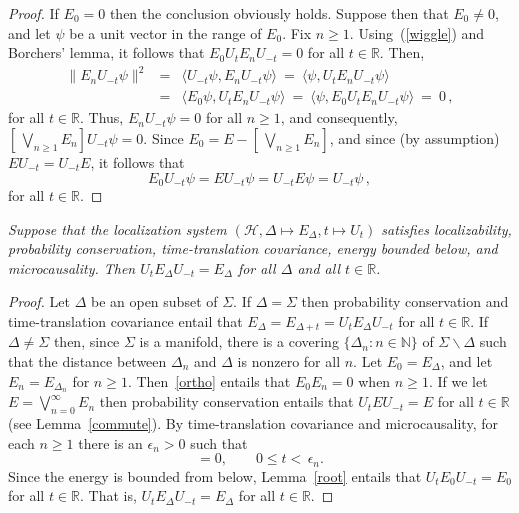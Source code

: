 \documentclass[11pt]{article}
\theoremstyle{remark}
\newcommand{\hil}[1]{\mathcal{#1}}
\begin{document}
\begin{appendix}
\begin{proof} If $E_{0}=0$ then the conclusion obviously
  holds.  Suppose then that $E_{0}\neq 0$, and let $\psi$ be a unit
  vector in the range of $E_{0}$.  Fix $n\geq 1$.
  Using~(\ref{wiggle}) and Borchers' lemma, it follows that
  $E_{0}U_{t}E_{n}U_{-t}=0$ for all $t\in \mathbb{R}$.  Then,
\begin{eqnarray}
\| E_{n}U_{-t}\psi \| ^{2} &=&\langle U_{-t}\psi ,E_{n}U_{-t}\psi \rangle \:=\: \langle \psi
,U_{t}E_{n}U_{-t}\psi \rangle \\
&=& \langle E_{0}\psi
,U_{t}E_{n}U_{-t}\psi \rangle \:=\: \langle \psi
,E_{0}U_{t}E_{n}U_{-t}\psi \rangle 
\:=\: 0\, ,\end{eqnarray}
for all $t\in \mathbb{R}$.  Thus, $E_{n}U_{-t}\psi =0$ for all $n\geq 1$, and consequently, 
$[\,\bigvee _{n\geq 1}E_{n}]U_{-t}\psi =0$.  Since $E_{0}=E-[\, \bigvee
_{n\geq 1}E_{n}]$, and since (by assumption) $EU_{-t}=U_{-t}E$, it follows that \begin{equation}
E_{0}U_{-t}\psi =EU_{-t}\psi =U_{-t}E\psi =U_{-t}\psi \,, \end{equation}
for all $t\in \mathbb{R}$.  \end{proof}

\vspace{0.5em}   {\it Suppose
  that the localization system $(\hil{H}, \Delta \mapsto
  E_{\Delta},t\mapsto U_{t})$ satisfies localizability, probability
  conservation, time-translation covariance, energy bounded below, and
  microcausality.  Then $U_{t}E_{\Delta}U_{-t}=E_{\Delta}$ for all
  $\Delta$ and all $t\in \mathbb{R}$.}

\begin{proof} Let $\Delta$ be an open subset of $\Sigma$.  
  If $\Delta =\Sigma$ then probability conservation and
  time-translation covariance entail that $E_{\Delta}=E_{\Delta
    +t}=U_{t}E_{\Delta}U_{-t}$ for all $t\in \mathbb{R}$.  If $\Delta
  \neq \Sigma$ then, since $\Sigma$ is a manifold, there is a covering
  $\{ \Delta _{n}:n\in \mathbb{N} \}$ of $\Sigma \backslash \Delta$
  such that the distance between $\Delta _{n}$ and $\Delta $ is
  nonzero for all $n$.  Let $E_{0}=E_{\Delta}$, and let
  $E_{n}=E_{\Delta _{n}}$ for $n\geq 1$.  Then~\ref{ortho} entails
  that $E_{0}E_{n}=0$ when $n\geq 1$.  If we let $E=\bigvee
  _{n=0}^{\infty}E_{n}$ then probability conservation entails that
  $U_{t}EU_{-t}=E$ for all $t\in \mathbb{R}$ (see
  Lemma~\ref{commute}).  By time-translation covariance and
  microcausality, for each $n\geq 1$ there is an $\epsilon _{n}>0$
  such that
\begin{equation} [E_{0},U_{t}E_{n}U_{-t}]=0 , \qquad 0\leq t< \,\epsilon
  _{n}.
\end{equation}  Since the energy is bounded from below, Lemma~\ref{root} entails that 
$U_{t}E_{0}U_{-t}=E_{0}$ for all $t\in \mathbb{R}$.  That is,
$U_{t}E_{\Delta}U_{-t}=E_{\Delta}$ for all $t\in \mathbb{R}$.
\end{proof}


\end{appendix}
\end{document}
